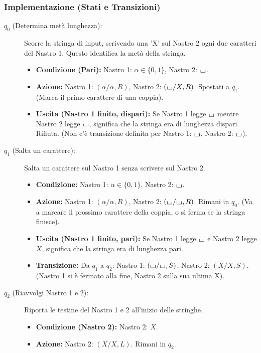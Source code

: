 \documentclass[a4paper]{article}
\theoremstyle{definition} %
\newcommand{\blankS}{\ensuremath{\raisebox{-0.15ex}{\scalebox{1.3}[0.7]{$\sqcup$}}}}
\begin{document}
\subsubsection{Implementazione (Stati e Transizioni)}
\begin{description}
    \item[$q_0$ (Determina metà lunghezza):] Scorre la stringa di input, scrivendo una 'X' sul Nastro 2 ogni due caratteri del Nastro 1. Questo identifica la metà della stringa.
    \begin{itemize}
        \item \textbf{Condizione (Pari):} Nastro 1: $\alpha \in \{0,1\}$, Nastro 2: $\blankS$.
        \item \textbf{Azione:} Nastro 1: $(\alpha/\alpha, R)$, Nastro 2: $(\blankS/X, R)$. Spostati a $q_1$. (Marca il primo carattere di una coppia).
        \item \textbf{Uscita (Nastro 1 finito, dispari):} Se Nastro 1 legge $\blankS$ mentre Nastro 2 legge $\blankS$, significa che la stringa era di lunghezza dispari. Rifiuta. (Non c'è transizione definita per Nastro 1: $\blankS$, Nastro 2: $\blankS$).
    \end{itemize}
    \item[$q_1$ (Salta un carattere):] Salta un carattere sul Nastro 1 senza scrivere sul Nastro 2.
    \begin{itemize}
        \item \textbf{Condizione:} Nastro 1: $\alpha \in \{0,1\}$, Nastro 2: $\blankS$.
        \item \textbf{Azione:} Nastro 1: $(\alpha/\alpha, R)$, Nastro 2: $(\blankS/\blankS, R)$. Rimani in $q_0$. (Va a marcare il prossimo carattere della coppia, o si ferma se la stringa finisce).
        \item \textbf{Uscita (Nastro 1 finito, pari):} Se Nastro 1 legge $\blankS$ e Nastro 2 legge $X$, significa che la stringa era di lunghezza pari.
        \item \textbf{Transizione:} Da $q_1$ a $q_2$: Nastro 1: $(\blankS/\blankS, S)$, Nastro 2: $(X/X, S)$. (Nastro 1 si è fermato alla fine, Nastro 2 sulla sua ultima X).
    \end{itemize}
    \item[$q_2$ (Riavvolgi Nastro 1 e 2):] Riporta le testine del Nastro 1 e 2 all'inizio delle stringhe.
    \begin{itemize}
        \item \textbf{Condizione (Nastro 2):} Nastro 2: $X$.
        \item \textbf{Azione:} Nastro 2: $(X/X, L)$. Rimani in $q_2$.

\end{itemize}
\end{description}
\end{document}
